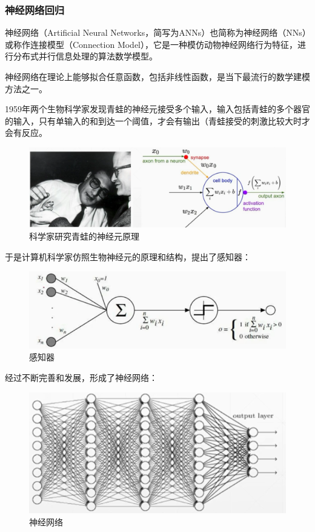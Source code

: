 \subsubsection{神经网络回归}
神经网络（Artificial Neural Networks，简写为ANNs）也简称为神经网络（NNs）或称作连接模型（Connection Model），它是一种模仿动物神经网络行为特征，进行分布式并行信息处理的算法数学模型。

神经网络在理论上能够拟合任意函数，包括非线性函数，是当下最流行的数学建模方法之一。

1959年两个生物科学家发现青蛙的神经元接受多个输入，输入包括青蛙的多个器官的输入，只有单输入的和到达一个阈值，才会有输出（青蛙接受的刺激比较大时才会有反应。

\begin{figure}[h]
	\centering
	\includegraphics[scale=0.5,angle=0]{images/2.png}
	\caption{科学家研究青蛙的神经元原理}
	\label{2}
\end{figure}


于是计算机科学家仿照生物神经元的原理和结构，提出了感知器：
\begin{figure}[h]
	\centering
	\includegraphics[scale=0.6,angle=0]{images/3.png}
	\caption{感知器}
	\label{3}
\end{figure}

经过不断完善和发展，形成了神经网络：
\begin{figure}[h]
	\centering
	\includegraphics[scale=0.6,angle=0]{images/4.png}
	\caption{神经网络}
	\label{4}
\end{figure}

